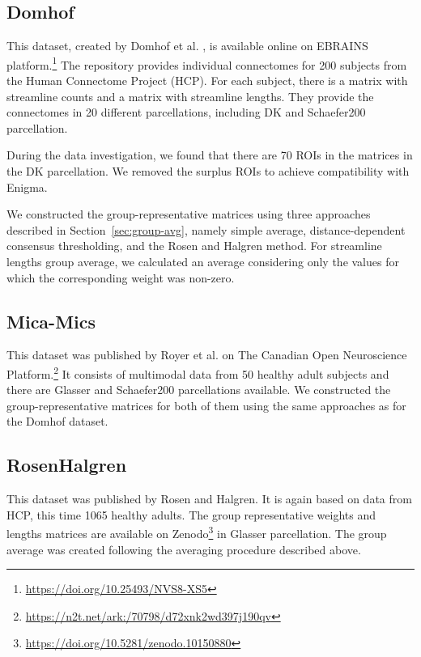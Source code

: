 \subsection{Domhof}

This dataset, created by Domhof et al. \cite{domhof_parcellation-based_2022}, is available online on EBRAINS platform.\footnote{\url{https://doi.org/10.25493/NVS8-XS5}} The repository provides individual connectomes for 200 subjects from the Human Connectome Project (HCP). For each subject, there is a matrix with streamline counts and a matrix with streamline lengths. They provide the connectomes in 20 different parcellations, including DK and Schaefer200 parcellation. 

During the data investigation, we found that there are 70 ROIs in the matrices in the DK parcellation. We removed the surplus ROIs to achieve compatibility with Enigma.

We constructed the group-representative matrices using three approaches described in Section~\ref{sec:group-avg}, namely simple average, distance-dependent consensus thresholding, and the Rosen and Halgren method. For streamline lengths group average, we calculated an average considering only the values for which the corresponding weight was non-zero.

\subsection{Mica-Mics}

This dataset was published by Royer et al. \cite{royer_open_2021} on The Canadian Open Neuroscience Platform.\footnote{\url{https://n2t.net/ark:/70798/d72xnk2wd397j190qv}} It consists of multimodal data from 50 healthy adult subjects and there are Glasser and Schaefer200 parcellations available. We constructed the group-representative matrices for both of them using the same approaches as for the Domhof dataset.

\subsection{RosenHalgren}

This dataset was published by Rosen and Halgren. \cite{rosen_whole-cortex_2021} It is again based on data from HCP, this time 1065 healthy adults. The group representative weights and lengths matrices are available on Zenodo\footnote{\url{https://doi.org/10.5281/zenodo.10150880}} in Glasser parcellation. The group average was created following the averaging procedure described above. 

